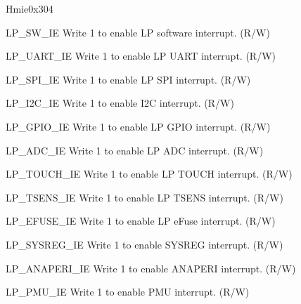 \begin{register}{H}{mie}{0x304}\label{regdesc:LPMIE}
%
%
%
%
%
%
%
%
%
%
%
%
%
%
%
%
%
%
%
%
%
%
%
\regnewline%
\begin{regdesc}\begin{reglist}
\label{fielddesc:LPMIELPSWIE}\item [LP\_SW\_IE] Write 1 to enable LP software interrupt. (R/W)
\label{fielddesc:LPMILPUARTIE}\item [LP\_UART\_IE] Write 1 to enable LP UART interrupt. (R/W)
\label{fielddesc:LPMIELPSPIIE}\item [LP\_SPI\_IE] Write 1 to enable LP SPI interrupt. (R/W)
\label{fielddesc:LPMIEI2CIE}\item [LP\_I2C\_IE] Write 1 to enable I2C interrupt. (R/W)
\label{fielddesc:LPMIEGPIOIE}\item [LP\_GPIO\_IE] Write 1 to enable LP GPIO interrupt. (R/W)
\label{fielddesc:LPMIEADCIE}\item [LP\_ADC\_IE] Write 1 to enable LP ADC interrupt. (R/W)
\label{fielddesc:LPMIETOUCHIE}\item [LP\_TOUCH\_IE] Write 1 to enable LP TOUCH interrupt. (R/W)
\label{fielddesc:LPMIETSENSIE}\item [LP\_TSENS\_IE] Write 1 to enable LP TSENS interrupt. (R/W)
\label{fielddesc:LPMIEEFUSEIE}\item [LP\_EFUSE\_IE] Write 1 to enable LP eFuse interrupt. (R/W)
\label{fielddesc:LPMIESYSREGIE}\item [LP\_SYSREG\_IE] Write 1 to enable SYSREG interrupt. (R/W)
\label{fielddesc:LPMIEANAPERIIE}\item [LP\_ANAPERI\_IE] Write 1 to enable ANAPERI interrupt. (R/W)
\label{fielddesc:LPMIEPMUIE}\item [LP\_PMU\_IE] Write 1 to enable PMU interrupt. (R/W)

\end{reglist}
\end{regdesc}
\end{register}
